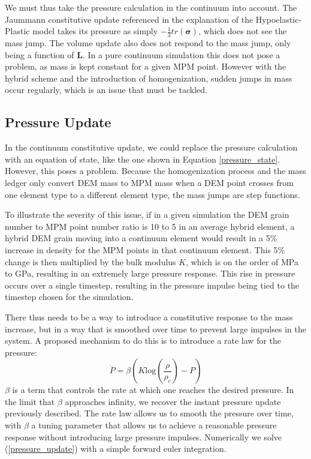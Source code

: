 We must thus take the pressure calculation in the continuum into account. The Jaummann constitutive update referenced in the explanation of the Hypoelastic-Plastic model takes its pressure as simply $-\frac{1}{3}tr(\bm{\sigma})$, which does not see the mass jump. The volume update also does not respond to the mass jump, only being a function of $\bm{L}$. In a pure continuum simulation this does not pose a problem, as mass is kept constant for a given MPM point. However with the hybrid scheme and the introduction of homogenization, sudden jumps in mass occur regularly, which is an issue that must be tackled. 

\subsection{Pressure Update}
In the continuum constitutive update, we could replace the pressure calculation with an equation of state, like the one shown in Equation \ref{pressure_state}. However, this poses a problem. Because the homogenization process and the mass ledger only convert DEM mass to MPM mass when a DEM point crosses from one element type to a different element type, the mass jumps are step functions.

To illustrate the severity of this issue, if in a given simulation the DEM grain number to MPM point number ratio is 10 to 5 in an average hybrid element, a hybrid DEM grain moving into a continuum element would result in a 5\% increase in density for the MPM points in that continuum element. This 5\% change is then multiplied by the bulk modulus $K$, which is on the order of MPa to GPa, resulting in an extremely large pressure response. This rise in pressure occurs over a single timestep, resulting in the pressure impulse being tied to the timestep chosen for the simulation.

There thus needs to be a way to introduce a constitutive response to the mass increase, but in a way that is smoothed over time to prevent large impulses in the system. A proposed mechanism to do this is to introduce a rate law for the pressure:
\begin{equation}
\dot P= \beta \left(K\text{log}\left(\frac{\rho}{\rho_c}\right)-P\right)
\label{pressure_update}
\end{equation}
$\beta$ is a term that controls the rate at which one reaches the desired pressure. In the limit that $\beta$ approaches infinity, we recover the instant pressure update previously described. The rate law allows us to smooth the pressure over time, with $\beta$ a tuning parameter that allows us to achieve a reasonable pressure response without introducing large pressure impulses. Numerically we solve (\ref{pressure_update}) with a simple forward euler integration.

